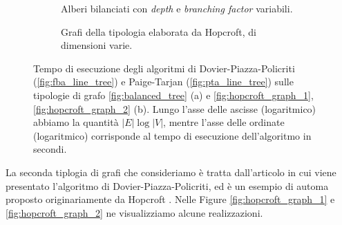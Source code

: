\begin{figure}
    \begin{subfigure}[t]{0.5\textwidth}
        \caption{Alberi bilanciati con \emph{depth} e \emph{branching factor} variabili.}
        \label{fig:tree_exp_result}
    \end{subfigure}
    \begin{subfigure}[t]{0.5\textwidth}
        \caption{Grafi della tipologia elaborata da Hopcroft, di dimensioni varie.}
        \label{fig:hopcroft_exp_result}
    \end{subfigure}
    \caption{Tempo di esecuzione degli algoritmi di Dovier-Piazza-Policriti (\ref*{fig:fba_line_tree}) e Paige-Tarjan (\ref*{fig:pta_line_tree}) sulle tipologie di grafo \ref{fig:balanced_tree} (a) e \ref{fig:hopcroft_graph_1}, \ref{fig:hopcroft_graph_2} (b). Lungo l'asse delle ascisse (logaritmico) abbiamo la quantità $|E|\log|V|$, mentre l'asse delle ordinate (logaritmico) corrisponde al tempo di esecuzione dell'algoritmo in secondi.}
\end{figure}

La seconda tiplogia di grafi che consideriamo è tratta dall'articolo in cui viene presentato l'algoritmo di Dovier-Piazza-Policriti, ed è un esempio di automa proposto originariamente da Hopcroft \cite{hopcroft}. Nelle Figure \ref{fig:hopcroft_graph_1} e \ref{fig:hopcroft_graph_2} ne visualizziamo alcune realizzazioni.

